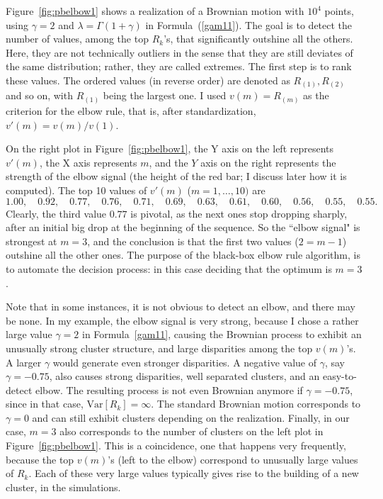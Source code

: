 \documentclass[10pt]{article}
\begin{document}

\noindent Figure~\ref{fig:pbelbow1} shows a realization of a Brownian motion with $10^4$ points, using $\gamma=2$ and
$\lambda=\Gamma(1+\gamma)$ in Formula~(\ref{gam11}).  The goal is to detect the number of values, among the top $R_k$'s, that significantly outshine all the others. Here, they are not technically outliers in the sense that they are still deviates of the same distribution; rather, they are called extremes.
The first step is to rank these values. The ordered values (in reverse order) are denoted as $R_{(1)},R_{(2)}$ and so on, with $R_{(1)}$ being the largest one. I
used $v(m)=R_{(m)}$ as the criterion for the elbow rule, that is, after standardization, $v'(m)=v(m)/v(1)$.

On the right plot in Figure~\ref{fig:pbelbow1}, the Y axis on the left represents $v'(m)$, the X axis represents $m$, and the $Y$ axis on the right represents the strength of the elbow signal (the height of the red bar; I discuss later how it is computed). The top 10 values of $v'(m)$ ($m=1,\dots, 10)$ are
$$1.00, \quad
0.92, \quad
0.77,\quad
0.76,\quad
0.71,\quad
0.69,\quad
0.63,\quad
0.61,\quad
0.60,\quad
0.56, \quad
0.55,\quad
0.55.$$
Clearly, the third value $0.77$ is pivotal, as the next ones stop dropping sharply, after an initial big drop at the beginning of the sequence. So the ``elbow signal" is strongest at $m=3$, and the conclusion is that the first two values ($2=m-1$) outshine all the other ones. The purpose of the black-box elbow rule algorithm, is to automate the decision process: in this case deciding that the optimum is $m=3$.

Note that in some instances, it is not obvious to detect an elbow, and there may be none. In my example, the elbow signal is very strong, because I chose a rather large value $\gamma=2$ in Formula~\ref{gam11}, causing the Brownian process to exhibit an unusually strong cluster structure, and large disparities among the top $v(m)$'s.
A larger $\gamma$ would generate even stronger disparities. A negative value of $\gamma$, say $\gamma=-0.75$, also causes strong disparities, well separated clusters, and an easy-to-detect elbow. The resulting process is not even Brownian anymore if $\gamma=-0.75$, since in that case, $\mbox{Var}[R_k]=\infty$. The
standard  Brownian motion corresponds to $\gamma=0$ and can still exhibit clusters depending on the realization. Finally, in our case, $m=3$ also corresponds to the number of clusters on the left plot in Figure~\ref{fig:pbelbow1}. This is a coincidence, one that happens very frequently, because the top $v(m)$'s (left to the elbow) correspond to unusually large values of $R_k$. Each of these very large values typically gives
 rise to the building of a new cluster, in the simulations.
\end{document}
